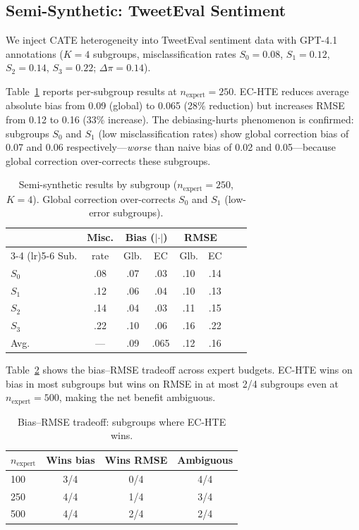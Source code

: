 \documentclass[11pt]{article}
\begin{document}
\subsection{Semi-Synthetic: TweetEval Sentiment}
\label{sec:exp-semisyn}

We inject CATE heterogeneity into TweetEval sentiment data with GPT-4.1 annotations ($K{=}4$ subgroups, misclassification rates $S_0{=}0.08$, $S_1{=}0.12$, $S_2{=}0.14$, $S_3{=}0.22$; $\Delta\pi = 0.14$).

Table~\ref{tab:semisyn} reports per-subgroup results at $n_{\text{expert}}{=}250$.
EC-HTE reduces average absolute bias from 0.09 (global) to 0.065 (28\% reduction) but increases RMSE from 0.12 to 0.16 (33\% increase).
The debiasing-hurts phenomenon is confirmed: subgroups $S_0$ and $S_1$ (low misclassification rates) show global correction bias of 0.07 and 0.06 respectively---\emph{worse} than naive bias of 0.02 and 0.05---because global correction over-corrects these subgroups.

\begin{table}[t]
\centering
\small
\caption{Semi-synthetic results by subgroup ($n_{\text{expert}}{=}250$, $K{=}4$). Global correction over-corrects $S_0$ and $S_1$ (low-error subgroups).}
\label{tab:semisyn}
\begin{tabular}{@{}lccccccc@{}}
\toprule
& Misc. & \multicolumn{2}{c}{Bias ($|\cdot|$)} & \multicolumn{2}{c}{RMSE} \\
\cmidrule(lr){3-4} \cmidrule(lr){5-6}
Sub. & rate & Glb. & EC & Glb. & EC \\
\midrule
$S_0$ & .08 & .07 & .03 & .10 & .14 \\
$S_1$ & .12 & .06 & .04 & .10 & .13 \\
$S_2$ & .14 & .04 & .03 & .11 & .15 \\
$S_3$ & .22 & .10 & .06 & .16 & .22 \\
\midrule
Avg. & --- & .09 & .065 & .12 & .16 \\
\bottomrule
\end{tabular}
\end{table}

Table~\ref{tab:semisyn-tradeoff} shows the bias--RMSE tradeoff across expert budgets.
EC-HTE wins on bias in most subgroups but wins on RMSE in at most 2/4 subgroups even at $n_{\text{expert}}{=}500$, making the net benefit ambiguous.

\begin{table}[t]
\centering
\small
\caption{Bias--RMSE tradeoff: subgroups where EC-HTE wins.}
\label{tab:semisyn-tradeoff}
\begin{tabular}{@{}lccc@{}}
\toprule
$n_{\text{expert}}$ & Wins bias & Wins RMSE & Ambiguous \\
\midrule
100 & 3/4 & 0/4 & 4/4 \\
250 & 4/4 & 1/4 & 3/4 \\
500 & 4/4 & 2/4 & 2/4 \\
\bottomrule
\end{tabular}
\end{table}
\end{document}

